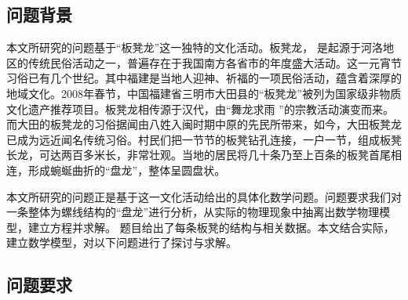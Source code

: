 \documentclass{cumcmthesis1}
\begin{document}
\subsection{问题背景}
本文所研究的问题基于“板凳龙”这一独特的文化活动。板凳龙， 是起源于河洛地区的传统民俗活动之一，普遍存在于我国南方各省市的年度盛大活动。这一元宵节习俗已有几个世纪。其中福建是当地人迎神、祈福的一项民俗活动，蕴含着深厚的地域文化。2008年春节，中国福建省三明市大田县的“板凳龙”被列为国家级非物质文化遗产推荐项目。板凳龙相传源于汉代，由“舞龙求雨 ”的宗教活动演变而来。而大田的板凳龙的习俗据闻由八姓入闽时期中原的先民所带来，如今，大田板凳龙已成为远近闻名传统习俗。村民们把一节节的板凳钻孔连接，一户一节，组成板凳长龙，可达两百多米长，非常壮观。当地的居民将几十条乃至上百条的板凳首尾相连，形成蜿蜒曲折的“盘龙”，整体呈圆盘状。\par
本文所研究的问题正是基于这一文化活动给出的具体化数学问题。问题要求我们对一条整体为螺线结构的“盘龙”进行分析，从实际的物理现象中抽离出数学物理模型，建立方程并求解。
题目给出了每条板凳的结构与相关数据。本文结合实际，建立数学模型，对以下问题进行了探讨与求解。\par
\subsection{问题要求}
\end{document}
